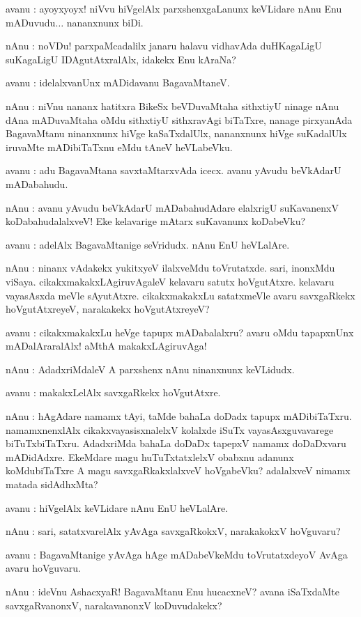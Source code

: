 avanu : ayoyxyoyx! niVvu hiVgelAlx parxshenxgaLanunx keVLidare nAnu Enu mADuvudu$\ldots$ nananxnunx biDi.

nAnu : noVDu! parxpaMcadalilx janaru halavu vidhavAda duHKagaLigU suKagaLigU IDAgutAtxralAlx, idakekx Enu kAraNa?

avanu : idelalxvanUnx mADidavanu BagavaMtaneV.

nAnu : niVnu nananx hatitxra BikeSx beVDuvaMtaha sithxtiyU ninage nAnu dAna mADuvaMtaha 
oMdu sithxtiyU sithxravAgi biTaTxre, nanage pirxyanAda BagavaMtanu ninanxnunx hiVge kaSaTxdalUlx, nananxnunx hiVge suKadalUlx iruvaMte mADibiTaTxnu eMdu tAneV heVLabeVku.

avanu : adu BagavaMtana savxtaMtarxvAda icecx. avanu yAvudu beVkAdarU mADabahudu.

nAnu : avanu yAvudu beVkAdarU mADabahudAdare elalxrigU suKavanenxV koDabahudalalxveV! Eke kelavarige mAtarx suKavanunx koDabeVku?

avanu : adelAlx BagavaMtanige seVridudx. nAnu EnU heVLalAre.

nAnu : ninanx vAdakekx yukitxyeV ilalxveMdu toVrutatxde. sari, inonxMdu viSaya. cikakxmakakxLAgiruvAgaleV kelavaru satutx hoVgutAtxre. kelavaru vayasAsxda meVle sAyutAtxre. cikakxmakakxLu satatxmeVle avaru savxgaRkekx hoVgutAtxreyeV, narakakekx hoVgutAtxreyeV?

avanu : cikakxmakakxLu heVge tapupx mADabalalxru? avaru oMdu tapapxnUnx mADalAraralAlx! aMthA makakxLAgiruvAga!

nAnu : AdadxriMdaleV A parxshenx nAnu ninanxnunx keVLidudx.

avanu : makakxLelAlx savxgaRkekx hoVgutAtxre.

nAnu : hAgAdare namamx tAyi, taMde bahaLa doDadx tapupx mADibiTaTxru. namamxnenxlAlx cikakxvayasisxnalelxV kolalxde iSuTx vayasAsxguvavarege biTuTxbiTaTxru. AdadxriMda bahaLa doDaDx tapepxV namamx doDaDxvaru mADidAdxre. EkeMdare magu huTuTxtatxlelxV obabxnu adanunx 
koMdubiTaTxre A magu savxgaRkakxlalxveV hoVgabeVku? adalalxveV nimamx matada sidAdhxMta?

avanu : hiVgelAlx keVLidare nAnu EnU heVLalAre.

nAnu : sari, satatxvarelAlx yAvAga savxgaRkokxV, narakakokxV hoVguvaru?

avanu : BagavaMtanige yAvAga hAge mADabeVkeMdu toVrutatxdeyoV AvAga avaru hoVguvaru.

nAnu : ideVnu AshacxyaR! BagavaMtanu Enu hucacxneV? avana iSaTxdaMte savxgaRvanonxV, narakavanonxV koDuvudakekx?

